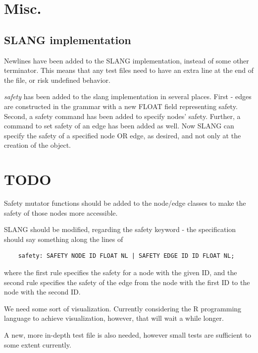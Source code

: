 \documentclass[11pt,a4paper]{article}
\begin{document}
	
	
	\section{Misc.}
	\subsection{SLANG implementation}
	Newlines have been added to the SLANG implementation, instead of some other terminator. This means that any test files need to have an extra line at the end of the file, or risk undefined behavior.
	
	\emph{safety} has been added to the slang implementation in several places. First - edges are constructed in the grammar with a new FLOAT field representing safety. Second, a safety command has been added to specify nodes' safety. Further, a command to set safety of an edge has been added as well. Now SLANG can specify the safety of a specified node OR edge, as desired, and not only at the creation of the object.
	
	
	\section{TODO}
	Safety mutator functions should be added to the node/edge classes to make the safety of those nodes more accessible.
	
	SLANG should be modified, regarding the safety keyword - the specification should say something along the lines of 
	\begin{verbatim}
	safety: SAFETY NODE ID FLOAT NL | SAFETY EDGE ID ID FLOAT NL;
	\end{verbatim}
	where the first rule specifies the safety for a node with the given ID, and the second rule specifies the safety of the edge from the node with the first ID to the node with the second ID. 
	
	We need some sort of visualization. Currently considering the R programming language to achieve visualization, however, that will wait a while longer.
	
	A new, more in-depth test file is also needed, however small tests are sufficient to some extent currently.
\end{document}

